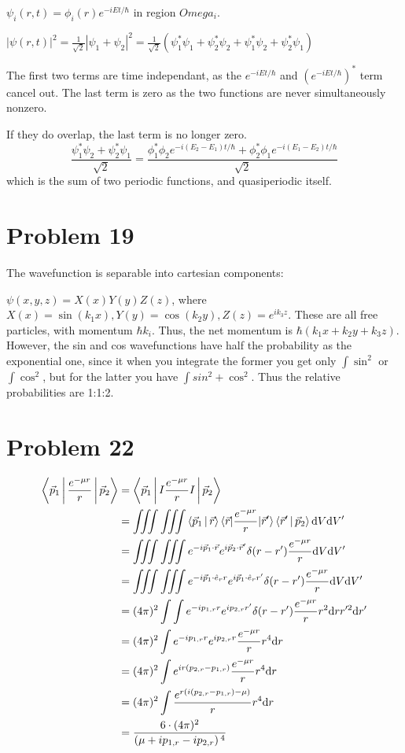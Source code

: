 \documentclass[12pt]{article}
\begin{document}
$\psi_i(r,t)=\phi_i(r)e^{-iEt/\hbar}$ in region $Omega_i$.

$|\psi(r,t)|^2=\frac1{\sqrt{2}}|\psi_1+\psi_2|^2=\frac1{\sqrt{2}}\left(\psi_1^*\psi_1+\psi_2^*\psi_2+\psi_1^*\psi_2+\psi_2^*\psi_1\right)$

The first two terms are time independant, as the $e^{-iEt/\hbar}$ and $\left(e^{-iEt/\hbar}\right)^*$ term cancel out. The last term is zero as the two functions are never simultaneously nonzero.

If they do overlap, the last term is no longer zero. $$\frac{\psi_1^*\psi_2+\psi_2^*\psi_1}{\sqrt{2}}=\frac{\phi_1^*\phi_2 e^{-i(E_2-E_1)t/\hbar} + \phi_2^*\phi_1 e^{-i(E_1-E_2)t/\hbar}}{\sqrt{2}}$$ which is the sum of two periodic functions, and quasiperiodic itself.

\section*{Problem 19}

The wavefunction is separable into cartesian components:

$\psi(x,y,z)=X(x)Y(y)Z(z)$, where $X(x)=\sin(k_1 x), Y(y)=\cos(k_2 y), Z(z)=e^{ik_3z}$. These are all free particles, with momentum $\hbar k_i$. Thus, the net momentum is $\hbar\left(k_1x+k_2y+k_3z\right)$. However, the sin and cos wavefunctions have half the probability as the exponential one, since it when you integrate the former you get only $\int \sin^2$ or $\int \cos^2$, but for the latter you have $\int sin^2+\cos^2$. Thus the relative probabilities are 1:1:2.

\section*{Problem 22}
\begin{align*}
\Braket{\vec p_1|\frac{e^{-\mu r}}{r}|\vec p_2} &= \Braket{\vec p_1|I\frac{e^{-\mu r}}{r}I|\vec p_2}\\
&=\iiint\iiint\Braket{\vec p_1|\vec r}\braket{\vec r|\frac{e^{-\mu r}}{r}|\vec r'}\Braket{\vec r'|\vec p_2} \mathrm d V \mathrm dV'\\
&= \iiint \iiint e^{-i\vec p_1\cdot\vec r}e^{i\vec p_2\cdot\vec r'}\delta(r-r')\frac{e^{-\mu r}}{r}\mathrm dV\mathrm dV'\\
&= \iiint \iiint e^{-i\vec p_1\cdot\hat e_r r}e^{i\vec p_1\cdot\hat e_r r'}\delta(r-r')\frac{e^{-\mu r}}{r}\mathrm dV\mathrm dV'\\
&= (4\pi)^2\int\int e^{-i p_{1,r}r}e^{i p_{2,r} r'}\delta(r-r')\frac{e^{-\mu r}}{r}r^2\mathrm drr'^2\mathrm dr'\\
&=(4\pi)^2 \int e^{-i p_{1,r} r}e^{ip_{2,r} r}\frac{e^{-\mu r}}{r}r^4\mathrm dr\\
&= (4\pi)^2\int e^{ir(p_{2,r}-p_{1,r})} \frac{e^{-\mu r}}{r} r^4\mathrm dr\\
&= (4\pi)^2\int \frac{e^{r(i(p_{2,r}-p_{1,r})-\mu)}}{r}r^4\mathrm dr\\
&= \frac{6\cdot (4\pi)^2}{\left(\mu +i p_{1,r}-i p_{2,r}\right){}^4}
\end{align*}
\end{document}
